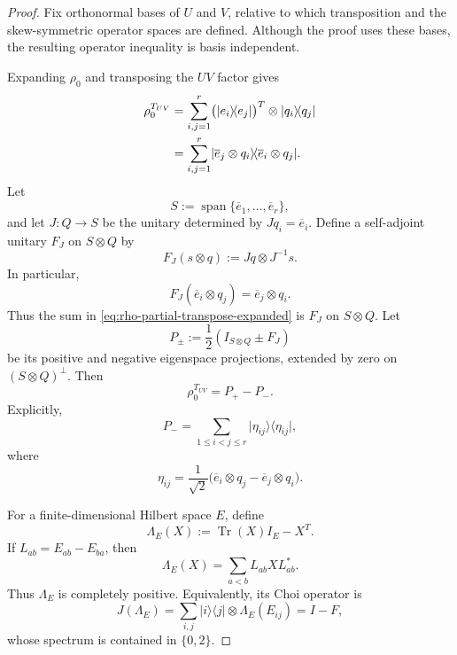 \documentclass[11pt,reqno]{amsart}
\theoremstyle{remark}
\DeclareMathOperator{\Tr}{Tr}
\newcommand{\ketbra}[2]{\lvert #1\rangle\!\langle #2\rvert}
\begin{document}
\begin{proof}
Fix orthonormal bases of $U$ and $V$, relative to which transposition
and the skew-symmetric operator spaces are defined. Although the proof
uses these bases, the resulting operator inequality is basis
independent.

Expanding $\rho_0$ and transposing the $UV$ factor gives
\begin{align}
    \rho_0^{T_{UV}}
    &=
    \sum_{i,j=1}^r
    \bigl(\ketbra{e_i}{e_j}\bigr)^T
    \otimes\ketbra{q_i}{q_j}
    \notag\\
    &=
    \sum_{i,j=1}^r
    \ketbra{\overline e_j\otimes q_i}
            {\overline e_i\otimes q_j}.
\label{eq:rho-partial-transpose-expanded}
\end{align}
Let
\[
    S:=\operatorname{span}
    \{\overline e_1,\ldots,\overline e_r\},
\]
and let $J:Q\to S$ be the unitary determined by
$Jq_i=\overline e_i$. Define a self-adjoint unitary $F_J$ on
$S\otimes Q$ by
\[
    F_J(s\otimes q)
    :=Jq\otimes J^{-1}s.
\]
In particular,
\[
    F_J(\overline e_i\otimes q_j)
    =\overline e_j\otimes q_i.
\]
Thus the sum in \cref{eq:rho-partial-transpose-expanded} is $F_J$ on
$S\otimes Q$. Let
\[
    P_\pm:=\frac12(I_{S\otimes Q}\pm F_J)
\]
be its positive and negative eigenspace projections, extended by zero
on $(S\otimes Q)^\perp$. Then
\begin{equation}
\label{eq:rho-partial-transpose}
    \rho_0^{T_{UV}}
    =P_+-P_-.
\end{equation}
Explicitly,
\[
    P_-
    =
    \sum_{1\le i<j\le r}
    \ketbra{\eta_{ij}}{\eta_{ij}},
\]
where
\begin{equation}
\label{eq:eta-ij}
    \eta_{ij}
    =
    \frac1{\sqrt2}
    \bigl(
      \overline e_i\otimes q_j
      -
      \overline e_j\otimes q_i
    \bigr).
\end{equation}

For a finite-dimensional Hilbert space $E$, define
\[
    \Lambda_E(X)
    :=
    \Tr(X)I_E-X^T.
\]
If $L_{ab}=E_{ab}-E_{ba}$, then
\begin{equation}
\label{eq:Lambda-kraus}
    \Lambda_E(X)
    =
    \sum_{a<b}L_{ab}XL_{ab}^*.
\end{equation}
Thus $\Lambda_E$ is completely positive. Equivalently, its Choi
operator is
\[
    J(\Lambda_E)
    =
    \sum_{i,j}
    \ketbra{i}{j}\otimes\Lambda_E(E_{ij})
    =I-F,
\]
whose spectrum is contained in $\{0,2\}$.


\end{proof}
\end{document}
